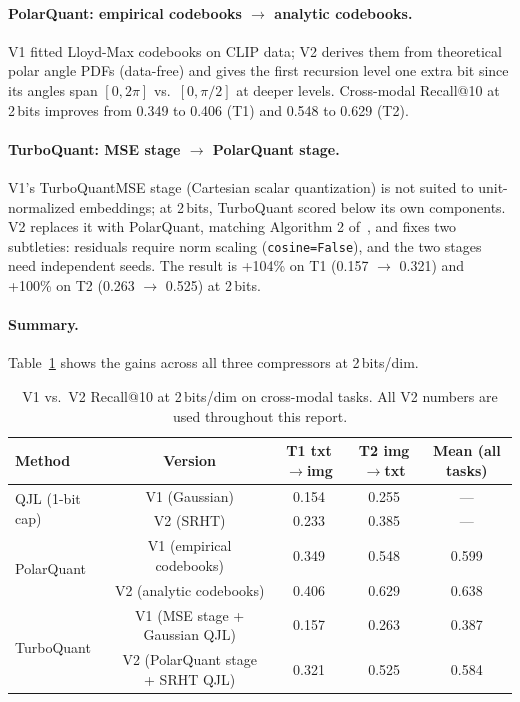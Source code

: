 \documentclass[11pt]{article}
\begin{document}
\paragraph{PolarQuant: empirical codebooks $\to$ analytic codebooks.}
V1 fitted Lloyd-Max codebooks on CLIP data; V2 derives them from theoretical polar angle PDFs
(data-free) and gives the first recursion level one extra bit since its angles span $[0,2\pi]$
vs.\ $[0,\pi/2]$ at deeper levels. Cross-modal Recall@10 at 2\,bits improves from 0.349 to 0.406
(T1) and 0.548 to 0.629 (T2).

\paragraph{TurboQuant: MSE stage $\to$ PolarQuant stage.}
V1's TurboQuantMSE stage (Cartesian scalar quantization) is not suited to unit-normalized embeddings;
at 2\,bits, TurboQuant scored below its own components. V2 replaces it with PolarQuant, matching
Algorithm 2 of~\cite{zandieh2026turboquant}, and fixes two subtleties: residuals require norm
scaling (\texttt{cosine=False}), and the two stages need independent seeds. The result is +104\% on
T1 (0.157 $\to$ 0.321) and +100\% on T2 (0.263 $\to$ 0.525) at 2\,bits.

\paragraph{Summary.} Table~\ref{tab:v1v2} shows the gains across all three compressors at 2\,bits/dim.

\begin{table}[h!]
  \centering
  \caption{V1 vs.\ V2 Recall@10 at 2\,bits/dim on cross-modal tasks. All V2 numbers are used throughout this report.}
  \label{tab:v1v2}
  \small
  \begin{tabular}{lcccc}
    \toprule
    \textbf{Method} & \textbf{Version} & \textbf{T1 txt$\to$img} & \textbf{T2 img$\to$txt} & \textbf{Mean (all tasks)} \\
    \midrule
    \multirow{2}{*}{QJL (1-bit cap)}
      & V1 (Gaussian) & 0.154 & 0.255 & --- \\
      & V2 (SRHT)     & 0.233 & 0.385 & --- \\
    \midrule
    \multirow{2}{*}{PolarQuant}
      & V1 (empirical codebooks) & 0.349 & 0.548 & 0.599 \\
      & V2 (analytic codebooks)  & 0.406 & 0.629 & 0.638 \\
    \midrule
    \multirow{2}{*}{TurboQuant}
      & V1 (MSE stage + Gaussian QJL) & 0.157 & 0.263 & 0.387 \\
      & V2 (PolarQuant stage + SRHT QJL) & 0.321 & 0.525 & 0.584 \\
    \bottomrule
  \end{tabular}
\end{table}
\end{document}
